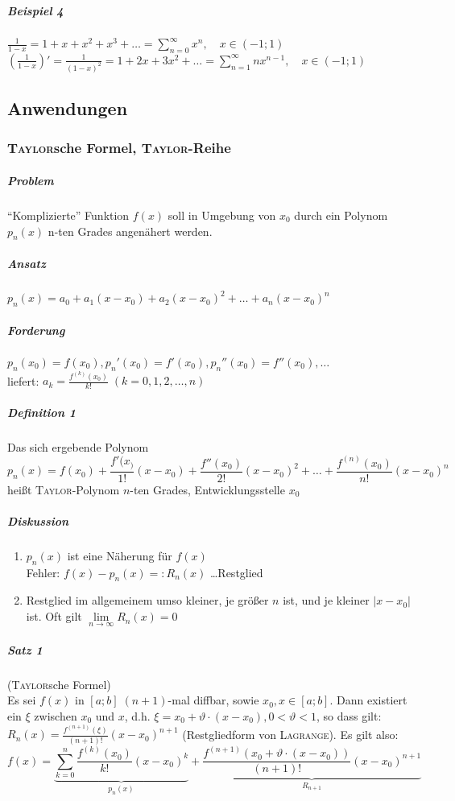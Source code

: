 \documentclass[a4paper]{scrartcl}
\begin{document}
\subparagraph{Beispiel 4} $\frac{1}{1-x}=1+x+x^2+x^3+\dots = \sum\limits_{n=0}^{\infty} x^n, \quad x\in (-1;1)$\\
$(\frac{1}{1-x})' = \frac{1}{(1-x)^2} = 1 + 2x +3x^2 + \dots = \sum\limits_{n=1}^{\infty} nx^{n-1}, \quad x\in (-1;1)$

\subsection{Anwendungen}
\subsubsection{\textsc{Taylor}sche Formel, \textsc{Taylor}-Reihe}
\subparagraph{Problem} "`Komplizierte"' Funktion $f(x)$ soll in Umgebung von $x_0$ durch ein Polynom $p_n(x)$ n-ten Grades angenähert werden.
\subparagraph{Ansatz} $p_n(x) = a_0 + a_1(x-x_0) + a_2(x-x_0)^2 + \dots +a_n(x-x_0)^n$
\subparagraph{Forderung} $p_n(x_0) = f(x_0), p_n'(x_0) = f'(x_0), p_n'' (x_0) = f''(x_0), \dots$\\
liefert: $a_k = \frac{f^{(k)}(x_0)}{k!} \; (k=0,1,2,\dots,n)$

\subparagraph{Definition 1} Das sich ergebende Polynom \[p_n(x) = f(x_0) + \frac{f'(x_)}{1!} (x-x_0) + \frac{f''(x_0)}{2!} (x-x_0)^2 + \dots + \frac{f^{(n)} (x_0)}{n!} (x-x_0)^n\]
heißt \textsc{Taylor}-Polynom $n$-ten Grades, Entwicklungsstelle $x_0$

\subparagraph{Diskussion}
\begin{enumerate}
\item $p_n(x)$ ist eine Näherung für $f(x)$\\
Fehler: $f(x)-p_n(x) =: R_n(x)$ \dots Restglied
\item Restglied im allgemeinem umso kleiner, je größer $n$ ist, und je kleiner $\lvert x -x_0 \rvert$ ist. Oft gilt $\lim\limits_{n \to \infty} R_n(x) =0$
\end{enumerate}

\subparagraph{Satz 1} (\textsc{Taylor}sche Formel)\\
Es sei $f(x)$ in $[a;b] \; (n+1)$-mal diffbar, sowie $x_0,x \in [a;b]$. Dann existiert ein $\xi$ zwischen $x_0$ und $x$, d.h. $\xi = x_0 + \vartheta \cdot (x-x_0), 0 < \vartheta < 1$, so dass gilt: $R_n (x) = \frac{f^{(n+1)}(\xi)}{(n+1)!} (x-x_0)^{n+1}$ (Restgliedform von \textsc{Lagrange}). Es gilt also:
\[f(x) = \underbrace{\sum\limits_{k=0}^{n} \frac{f^{(k)}(x_0)}{k!} (x-x_0)^k}_{p_n(x)} + \underbrace{\frac{f^{(n+1)} (x_0 + \vartheta \cdot (x-x_0))}{(n+1)!} (x-x_0)^{n+1}}_{R_{n+1}}\]
\end{document}

